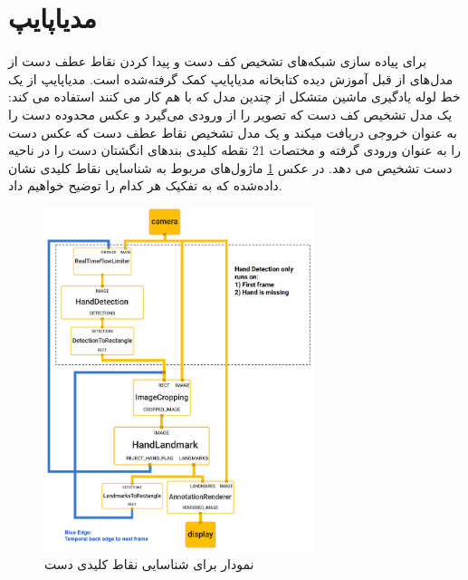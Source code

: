 \section{مدیاپایپ}
برای پیاده سازی شبکه‌های تشخیص کف دست و پیدا کردن نقاط عطف دست از مدل‌های از قبل آموزش دیده کتابخانه مدیاپایپ کمک گرفته‌شده است. مدیاپایپ  از یک خط لوله
یادگیری ماشین متشکل از چندین مدل که با هم کار می کنند استفاده می کند: یک مدل تشخیص کف دست 
که تصویر را از ورودی می‌گیرد و  عکس محدوده دست را به عنوان خروجی دریافت میکند و یک مدل تشخیص نقاط عطف دست 
که عکس دست را به عنوان ورودی گرفته و مختصات‌ 21 نقطه کلیدی بند‌های انگشتان دست را در ناحیه دست تشخیص می دهد.
در عکس \ref{chart} ماژول‌های مربوط به شناسایی نقاط کلیدی نشان داده‌شده که به تفکیک هر کدام را توضیح خواهیم داد.

\begin{figure}[h]
    \centering
    \includegraphics[width=0.7\textwidth]{hand_chart.png}
    \caption{نمودار  برای شناسایی نقاط کلیدی دست}
    \label{chart}
\end{figure}

